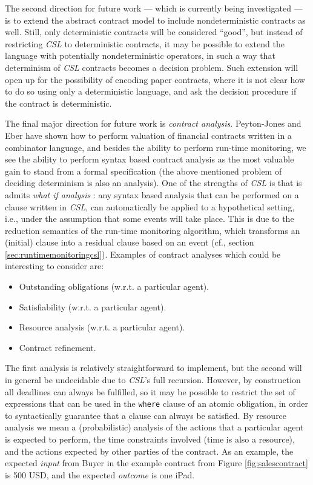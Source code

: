 \documentclass[orivec,final]{llncs-href}
\newcommand{\csl}{\textit{CSL}}
\begin{document}
The second direction for future work --- which is currently being
investigated --- is to extend the abstract contract model to include
nondeterministic contracts as well. Still, only deterministic
contracts will be considered ``good'', but instead of restricting
\csl{} to deterministic contracts, it may be possible to extend the
language with potentially nondeterministic operators, in such a way
that determinism of \csl{} contracts becomes a decision problem. Such
extension will open up for the possibility of encoding paper
contracts, where it is not clear how to do so using only a
deterministic language, and ask the decision procedure if the contract
is deterministic.

The final major direction for future work is \emph{contract
  analysis}. Peyton-Jones and Eber \cite{jones03contracts} have shown
how to perform valuation of financial contracts written in a
combinator language, and besides the ability to perform run-time
monitoring, we see the ability to perform syntax based contract
analysis as the most valuable gain to stand from a formal
specification (the above mentioned problem of deciding determinism is
also an analysis). One of the strengths of \csl{} is that is admits
\emph{what if analysis} \cite{tan01survey}: any syntax based analysis
that can be performed on a clause written in \csl{}, can automatically
be applied to a hypothetical setting, i.e., under the assumption that
some events will take place. This is due to the reduction semantics
of the run-time monitoring algorithm, which transforms an (initial)
clause into a residual clause based on an event (cf., section
\ref{sec:runtimemonitoringcsl}). Examples of contract analyses which could be
interesting to consider are:
\begin{itemize}
\item Outstanding obligations (w.r.t. a particular agent).
\item Satisfiability (w.r.t. a particular agent).
\item Resource analysis (w.r.t. a particular agent).
\item Contract refinement.
\end{itemize}
The first analysis is relatively straightforward to implement, but the
second will in general be undecidable due to \csl{}'s full
recursion. However, by construction all deadlines can always be
fulfilled, so it may be possible to restrict the set of expressions
that can be used in the \texttt{where} clause of an atomic obligation,
in order to syntactically guarantee that a clause can always be
satisfied. By resource analysis we mean a (probabilistic) analysis of
the actions that a particular agent is expected to perform, the time
constraints involved (time is also a resource), and the
actions expected by other parties of the contract. As an example, the
expected \emph{input} from Buyer in the example contract from Figure
\ref{fig:salescontract} is 500 USD, and the expected \emph{outcome} is
one iPad. 
\end{document}
